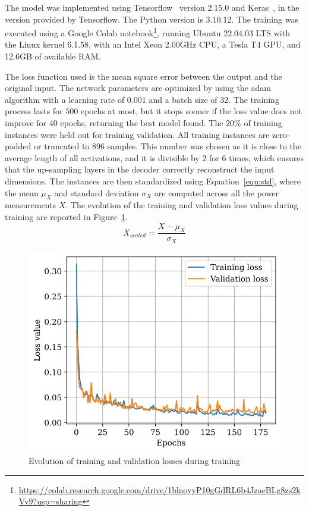 The model was implemented using Tensorflow~\parencite{abadiTensorFlowLargeScaleMachine2016,tensorflowdevelopersTensorFlow2023} version 2.15.0 and Keras~\parencite{cholletKeras2015}, in the version provided by Tensorflow. The Python version is 3.10.12. The training was executed using a Google Colab notebook\footnote{\url{https://colab.research.google.com/drive/1blnoyyP10gGdRL6b4JzaeBLg8zs2kVv9?usp=sharing}}, running Ubuntu 22.04.03 LTS with the Linux kernel 6.1.58, with an Intel Xeon 2.00GHz CPU, a Tesla T4 GPU, and 12.6GB of available RAM.

The loss function used is the mean square error between the output and the original input. The network parameters are optimized by using the \acrfull{adam} algorithm with a learning rate of $0.001$ and a batch size of $32$. The training process lasts for $500$ epochs at most, but it stops sooner if the loss value does not improve for $40$ epochs, returning the best model found. The $20\%$ of training instances were held out for training validation. All training instances are zero-padded or truncated to $896$ samples. This number was chosen as it is close to the average length of all activations, and it is divisible by $2$ for $6$ times, which ensures that the up-sampling layers in the decoder correctly reconstruct the input dimensions. The instances are then standardized using Equation~\eqref{equ:std}, where the mean $\mu_X$ and standard deviation $\sigma_X$ are computed across all the power measurements $X$. The evolution of the training and validation loss values during training are reported in Figure~\ref{fig:autoencoder_losses}.
\begin{equation}\label{equ:std}
  X_{scaled} = \frac{X - \mu_X}{\sigma_X}
\end{equation}

\begin{figure}
  \centering
  \includegraphics[width=.51\linewidth]{images/modes_clustering/loss.png}
  \caption{Evolution of training and validation losses during training}
  \label{fig:autoencoder_losses}
\end{figure}

